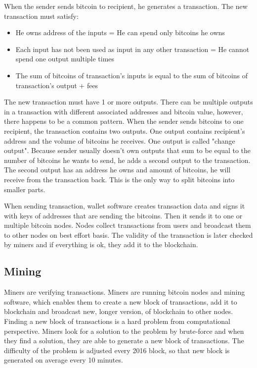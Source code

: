 \documentclass[
  digital, %
  table,   %
  lof,     %
  lot,     %
  oneside
]{fithesis3}
\begin{document}
When the sender sends bitcoin to recipient, he generates a transaction.
The new transaction must satisfy:
\begin{itemize}
  \item He owns address of the inputs = He can spend only bitcoins he owns
  \item Each input has not been used as input in any other transaction = He cannot spend one output multiple times
  \item The sum of bitcoins of transaction's inputs is equal to the sum of bitcoins of transaction's output + fees
\end{itemize}

The new transaction must have 1 or more outputs.
There can be multiple outputs in a transaction with different associated addresses and bitcoin value,
however, there happens to be a common pattern. When the sender sends bitcoins to one recipient,
the transaction contains two outputs.
One output contains recipient's address and the volume of bitcoins he receives.
One output is called "change output". Because sender usually doesn't own outputs that sum to be equal to the number of bitcoins he wants to send, he adds a second output to the transaction. The second output has an address he owns and amount of bitcoins, he will receive from the transaction back.
 This is the only way to split bitcoins into smaller parts. 

When sending transaction,
 wallet software creates transaction data and signs it with keys of addresses that are sending the bitcoins.
 Then it sends it to one or multiple bitcoin nodes.
Nodes collect transactions from users and broadcast them to other nodes on best effort basis.
The validity of the transaction is later checked by miners and if everything is ok, they add it to the blockchain.

\subsection{Mining}

Miners are verifying transactions.
Miners are running bitcoin nodes and mining software, which enables them to create a new block of transactions, add it to blockchain and broadcast new, longer version, of blockchain to other nodes.
Finding a new block of transactions is a hard problem from computational perspective.
Miners look for a solution to the problem by brute-force and when they find a solution, they are able to generate a new block of transactions. The difficulty of the problem is adjusted every 2016 block,
so that new block is generated on average every 10 minutes.
\end{document}
